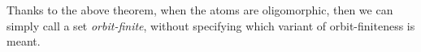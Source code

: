 Thanks to the above theorem, when the atoms are oligomorphic, then we can simply call a set \emph{orbit-finite}, without specifying which variant of orbit-finiteness is meant.

